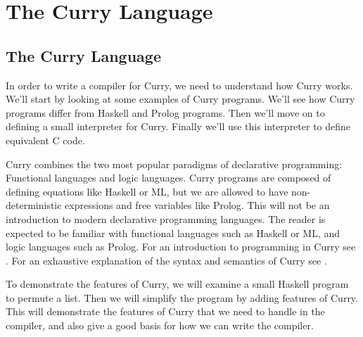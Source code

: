 \documentclass{book}
\theoremstyle{definition}
\begin{document}
\chapter{The Curry Language}


\section{The Curry Language}

In order to write a compiler for Curry, we need to understand how Curry works.
We'll start by looking at some examples of Curry programs.
We'll see how Curry programs differ from Haskell and Prolog programs.
Then we'll move on to defining a small interpreter for Curry.
Finally we'll use this interpreter to define equivalent C code.

Curry combines the two most popular paradigms of declarative programming:
Functional languages and logic languages.
Curry programs are composed of defining equations like Haskell or ML,
but we are allowed to have non-deterministic expressions and free variables like Prolog.
This will not be an introduction to modern declarative programming languages.
The reader is expected to be familiar with functional languages such as Haskell or ML,
and logic languages such as Prolog.
For an introduction to programming in Curry see \cite{CurryTutorial}.
For an exhaustive explanation of the syntax and semantics of Curry see \cite{CurryReport}.

To demonstrate the features of Curry, we will examine a small Haskell program to permute a list.
Then we will simplify the program by adding features of Curry.
This will demonstrate the features of Curry that we need to handle in the compiler,
and also give a good basis for how we can write the compiler.
\end{document}
